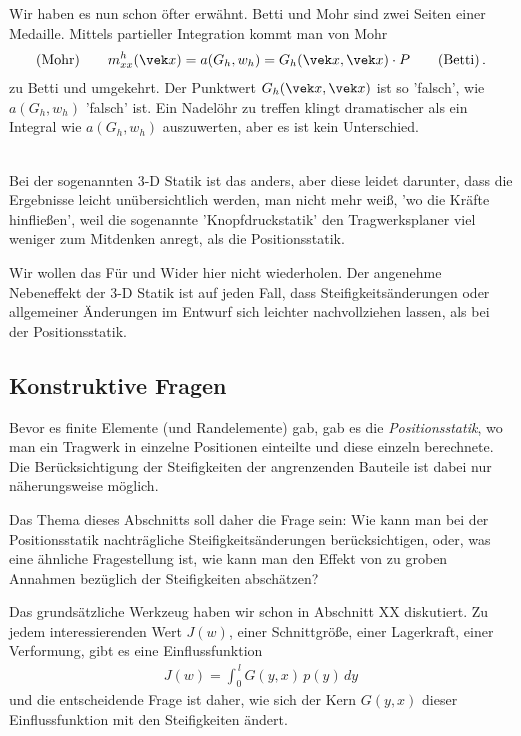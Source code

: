 {{{{\begin{remark}
Wir haben es nun schon \"{o}fter erw\"{a}hnt. Betti und Mohr sind zwei Seiten einer Medaille. Mittels partieller Integration kommt man von Mohr
\begin{align}
\text{(Mohr)} \qquad m_{xx}^h(\vek x) = a(G_h,w_h) = G_h(\vek x,\vek x) \cdot P \qquad \text{(Betti)}\,.
\end{align}
zu Betti und umgekehrt. Der Punktwert $G_h(\vek x,\vek x)$ ist so 'falsch', wie $a(G_h,w_h)$ 'falsch' ist. Ein Nadel\"{o}hr zu treffen klingt dramatischer als ein Integral wie $a(G_h,w_h)$ auszuwerten, aber es ist kein Unterschied.
\end{remark}
\\

Bei der sogenannten 3-D Statik ist das anders, aber diese leidet darunter, dass die Ergebnisse leicht un\"{u}bersichtlich werden, man nicht mehr wei{\ss}, 'wo die Kr\"{a}fte hinflie{\ss}en', weil die sogenannte 'Knopfdruckstatik' den Tragwerksplaner viel weniger zum Mitdenken anregt, als die Positionsstatik.

Wir wollen das F\"{u}r und Wider hier nicht wiederholen. Der angenehme Nebeneffekt der 3-D Statik ist auf jeden Fall, dass Steifigkeits\"{a}nderungen oder allgemeiner \"{A}nderungen im Entwurf sich leichter nachvollziehen lassen, als bei der Positionsstatik.\\

\textcolor{blau2}{\section{Konstruktive Fragen}}
Bevor es finite Elemente (und Randelemente) gab, gab es die {\em Positionsstatik\/}, wo man ein Tragwerk in einzelne Positionen einteilte und diese einzeln berechnete. Die Ber\"{u}cksichtigung der Steifigkeiten der angrenzenden Bauteile ist dabei nur n\"{a}herungsweise m\"{o}glich.

Das Thema dieses Abschnitts soll daher die Frage sein: Wie kann man bei der Positionsstatik nachtr\"{a}gliche Steifigkeits\"{a}nderungen ber\"{u}cksichtigen, oder, was eine \"{a}hnliche Fragestellung ist, wie kann man den Effekt von zu groben Annahmen bez\"{u}glich der Steifigkeiten absch\"{a}tzen?

Das grunds\"{a}tzliche Werkzeug haben wir schon in Abschnitt XX diskutiert. Zu jedem interessierenden Wert $J(w)$, einer Schnittgr\"{o}{\ss}e, einer Lagerkraft, einer Verformung, gibt es eine Einflussfunktion
\begin{align}
J(w) = \int_0^{\,l} G(y,x)\,p(y)\,dy
\end{align}
und die entscheidende Frage ist daher, wie sich der Kern $G(y,x)$ dieser Einflussfunktion mit den Steifigkeiten \"{a}ndert.

}}}}
